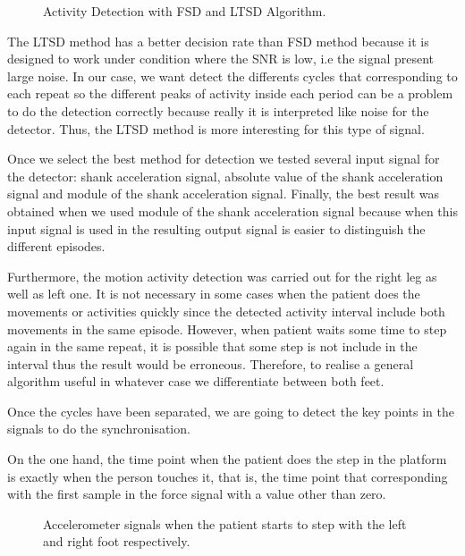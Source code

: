 \begin{figure}[H]
	\centering
	\caption{Activity Detection with FSD and LTSD Algorithm.}
	\label{fig:activityDetection}
\end{figure} 

The LTSD method has a better decision rate than FSD method because it is designed to work under condition where the SNR is low, i.e the signal present large noise\cite{A.Olivares2013}. In our case, we want detect the differents cycles that corresponding to each repeat so the different peaks of activity inside each period can be a problem to do the detection correctly because really it is interpreted like noise for the detector. Thus, the LTSD method is more interesting for this type of signal.

Once we select the best method for detection we tested several input signal for the detector: shank acceleration signal, absolute value of the shank acceleration signal and module of the shank acceleration signal. Finally, the best result was obtained when we used module of the shank acceleration signal because when this input signal is used in the resulting output signal is easier to distinguish the different episodes.

Furthermore, the motion activity detection was carried out for the right leg as well as left one. It is not necessary in some cases when the patient does the movements or activities quickly since the detected activity interval  include both movements in the same episode. However, when patient waits some time to step again in the same repeat, it is possible that some step is not  include in the interval thus the result would be erroneous. Therefore, to realise a general algorithm useful in whatever case we differentiate between both feet.

Once the cycles have been separated, we are going to detect the key points in the signals to do the synchronisation. 

On the one hand, the time point when the patient does the step in the platform is exactly when the person touches it, that is, the time point that corresponding with the first sample in the force signal with a value other than zero.

\begin{figure}[H]
	\centering
	\caption{Accelerometer signals when the patient starts to step with the left and right foot respectively.}
	\label{fig:startLeftRight}
\end{figure} 


